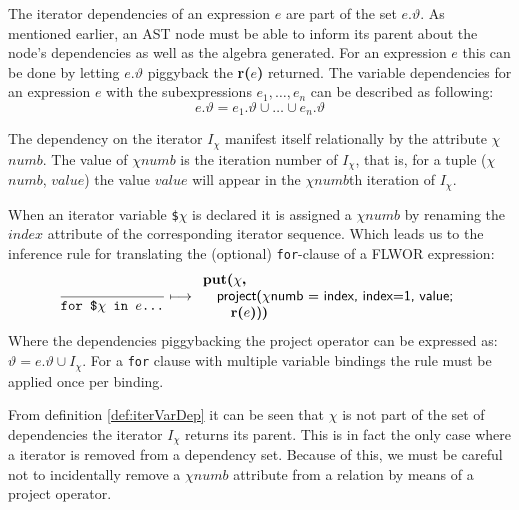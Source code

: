 The iterator dependencies of an expression $e$ are part of the set $e.\vartheta$. As mentioned earlier,
an AST node must be able to inform its parent about the node's dependencies as well as the algebra generated. For
an expression $e$ this can be done by letting $e.\vartheta$ piggyback the \textbf{r(}$e$\textbf{)} returned. The
variable dependencies for an expression $e$ with the subexpressions $e_{1},\ldots,e_{n}$ can be described as
following:
\begin{equation}
e.\vartheta = e_{1}.\vartheta\cup\ldots\cup e_{n}.\vartheta
\label{eq:trans:TD:depInheritance}
\end{equation}

The dependency on the iterator $I_{\chi}$ manifest itself relationally by the
attribute $\chi$$numb$. The value of $\chi$$numb$ is the iteration number of $I_{\chi}$, that is, for a tuple ($\chi$$numb$, $value$) the value $value$
will appear in the $\chi$$numb$th iteration of $I_{\chi}$.

When an iterator variable \texttt{\$}$\chi$ is declared it is assigned a $\chi$$numb$ by renaming the $index$
attribute of the corresponding iterator sequence. Which leads us to the inference rule for translating
the (optional) \texttt{for}-clause of a FLWOR expression:
\begin{equation}
\frac{}{\mbox{\texttt{for \$}}\chi \mbox{\texttt{ in }} e \mbox{\texttt{\ldots}}}\longmapsto
\begin{array}{l}
\mbox{\textbf{put(}}\chi\mbox{\textbf{, }} \\ \quad
\mbox{\textsf{project(}}\chi\mbox{\textsf{numb = index, index=1, value;}} \\ \quad \quad
\mbox{\textbf{r(}}e\mbox{\textbf{)}\textsf{)}\textbf{)}}
\end{array}
\label{rule:trans:TD:forbind}
\end{equation}
Where the dependencies piggybacking the \textsf{project} operator can be
expressed as: $\vartheta = e.\vartheta \cup I_{\chi}$. For a \texttt{for} clause with multiple variable bindings
the rule must be applied once per binding.

From definition \ref{def:iterVarDep} it can be seen that $\chi$ is not part of
the set of dependencies the iterator $I_{\chi}$ returns its parent. This is in
fact the only case where a iterator is removed from a dependency set. Because of this, we must be careful not to
incidentally remove a $\chi$$numb$ attribute from a relation by means of a \textsf{project} operator.


